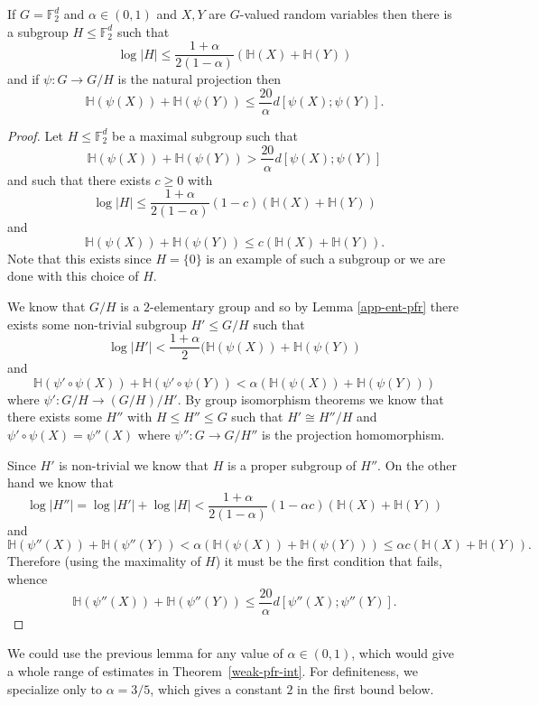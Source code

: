 \begin{lemma}\label{pfr-projection'}\leanok
If $G=\mathbb{F}_2^d$ and $\alpha\in (0,1)$ and $X,Y$ are $G$-valued random
variables then there is a subgroup $H\leq \mathbb{F}_2^d$ such that
\[\log \lvert H\rvert \leq \frac{1+\alpha}{2(1-\alpha)} (\mathbb{H}(X)+\mathbb{H}(Y))\]
and if $\psi:G \to G/H$ is the natural projection then
\[\mathbb{H}(\psi(X))+\mathbb{H}(\psi(Y))\leq \frac{20}{\alpha} d[\psi(X);\psi(Y)].\]
\end{lemma}
\begin{proof}\leanok
Let $H\leq \mathbb{F}_2^d$ be a maximal subgroup such that
\[\mathbb{H}(\psi(X))+\mathbb{H}(\psi(Y))> \frac{20}{\alpha} d[\psi(X);\psi(Y)]\]
and such that there exists $c \ge 0$ with
\[\log \lvert H\rvert \leq \frac{1+\alpha}{2(1-\alpha)}(1-c)(\mathbb{H}(X)+\mathbb{H}(Y))\]
and
\[\mathbb{H}(\psi(X))+\mathbb{H}(\psi(Y))\leq c (\mathbb{H}(X)+\mathbb{H}(Y)).\]
Note that this exists since $H=\{0\}$ is an example of such a subgroup or we are done with this choice of $H$.

We know that $G/H$ is a $2$-elementary group and so by Lemma
\ref{app-ent-pfr} there exists some non-trivial subgroup $H'\leq G/H$ such
that
\[\log \lvert H'\rvert < \frac{1+\alpha}{2}(\mathbb{H}(\psi(X))+\mathbb{H}(\psi(Y))\]
and
\[\mathbb{H}(\psi' \circ\psi(X))+\mathbb{H}(\psi' \circ \psi(Y))< \alpha(\mathbb{H}(\psi(X))+\mathbb{H}(\psi(Y)))\]
where $\psi':G/H\to (G/H)/H'$. By group isomorphism theorems we know that
there exists some $H''$ with $H\leq H''\leq G$ such that $H'\cong H''/H$ and
$\psi' \circ \psi(X)=\psi''(X)$ where $\psi'':G\to G/H''$ is the projection
homomorphism.

Since $H'$ is non-trivial we know that $H$ is a proper subgroup of $H''$. On the other hand we know that
\[\log \lvert H''\rvert=\log \lvert H'\rvert+\log \lvert H\rvert< \frac{1+\alpha}{2(1-\alpha)}(1-\alpha c)(\mathbb{H}(X)+\mathbb{H}(Y))\]
and
\[\mathbb{H}(\psi''(X))+\mathbb{H}(\psi''(Y))< \alpha (\mathbb{H}(\psi(X))+\mathbb{H}(\psi(Y)))\leq \alpha c (\mathbb{H}(X)+\mathbb{H}(Y)).\]
Therefore (using the maximality of $H$) it must be the first condition that fails, whence
\[\mathbb{H}(\psi''(X))+\mathbb{H}(\psi''(Y))\leq \frac{20}{\alpha}d[\psi''(X);\psi''(Y)].\]
\end{proof}

We could use the previous lemma for any value of $\alpha \in (0,1)$, which
would give a whole range of estimates in Theorem~\ref{weak-pfr-int}. For
definiteness, we specialize only to $\alpha=3/5$, which gives a constant $2$
in the first bound below.

